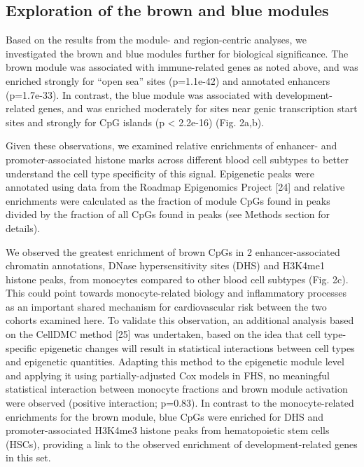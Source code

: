 \documentclass[]{bmcart}
\begin{document}
\subsection{Exploration of the brown and blue
modules}\label{exploration-of-the-brown-and-blue-modules}

Based on the results from the module- and region-centric analyses, we
investigated the brown and blue modules further for biological
significance. The brown module was associated with immune-related genes
as noted above, and was enriched strongly for ``open sea'' sites
(p=1.1e-42) and annotated enhancers (p=1.7e-33). In contrast, the blue
module was associated with development-related genes, and was enriched
moderately for sites near genic transcription start sites and strongly
for CpG islands (p \textless{} 2.2e-16) (Fig. 2a,b).

Given these observations, we examined relative enrichments of enhancer-
and promoter-associated histone marks across different blood cell
subtypes to better understand the cell type specificity of this signal.
Epigenetic peaks were annotated using data from the Roadmap Epigenomics
Project {[}24{]} and relative enrichments were calculated as the
fraction of module CpGs found in peaks divided by the fraction of all
CpGs found in peaks (see Methods section for details).

We observed the greatest enrichment of brown CpGs in 2
enhancer-associated chromatin annotations, DNase hypersensitivity sites
(DHS) and H3K4me1 histone peaks, from monocytes compared to other blood
cell subtypes (Fig. 2c). This could point towards monocyte-related
biology and inflammatory processes as an important shared mechanism for
cardiovascular risk between the two cohorts examined here. To validate
this observation, an additional analysis based on the CellDMC method
{[}25{]} was undertaken, based on the idea that cell type-specific
epigenetic changes will result in statistical interactions between cell
types and epigenetic quantities. Adapting this method to the epigenetic
module level and applying it using partially-adjusted Cox models in FHS,
no meaningful statistical interaction between monocyte fractions and
brown module activation were observed (positive interaction; p=0.83). In
contrast to the monocyte-related enrichments for the brown module, blue
CpGs were enriched for DHS and promoter-associated H3K4me3 histone peaks
from hematopoietic stem cells (HSCs), providing a link to the observed
enrichment of development-related genes in this set.
\end{document}
